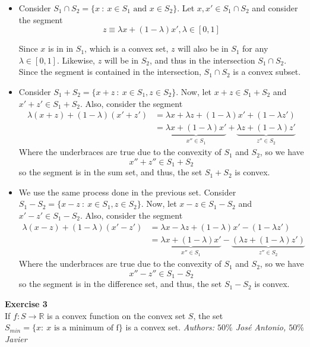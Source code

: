 \documentclass[11pt,table]{article}
\newenvironment{problem}[2][Exercise]
{ \begin{mdframed}[backgroundcolor=gray!20] \textbf{#1 #2} \\}
	{\hspace{0.0cm}\newline\newline \emph{Authors: \(50\%\) José Antonio, \(50\%\) Javier}  \end{mdframed}}
\begin{document}
	\begin{itemize}
		\item Consider \(S_{1} \cap S_{2}  =  \{x \ : \ x \in S_{1} \text{ and } x \in S_{2}\}\). Let \(x,x' \in S_1 \cap S_2\) and consider the segment
		\[
		z \equiv \lambda x + (1-\lambda)x', \lambda \in [0,1]
		\]
		
		Since \(x\) is in in \(S_1\), which is a convex set, \(z\) will also be in \(S_1\) for any \(\lambda \in [0,1]\). Likewise, \(z\) will be in \(S_2\), and thus in the intersection \(S_{1} \cap S_{2}\). Since the segment is contained in the intersection, \(S_{1} \cap S_{2}\) is a convex subset.
		
		\item Consider \(S_{1} + S_{2}  =  \{x + z \ : \ x \in S_{1}, z \in S_{2}\}\). Now, let \(x+z \in S_1 + S_2\) and \(x'+z' \in S_1+S_2\). Also, consider the segment
		\begin{align*}
			\lambda(x+z) + (1-\lambda)(x'+z') & = \lambda x + \lambda z + (1-\lambda)x' + (1-\lambda z')                                                     \\
			& = \underbrace{\lambda x +(1-\lambda)x'}_{x'' \in S_1} + \underbrace{\lambda z + (1-\lambda)z'}_{z'' \in S_2}
		\end{align*}
		Where the underbraces are true due to the convexity of \(S_1\) and \(S_2\), so we have
		\[
		x'' + z'' \in S_1 + S_2
		\]
		so the segment is in the sum set, and thus, the set \(S_1 + S_2\) is convex.
		
		\item We use the same process done in the previous set. Consider \(S_{1} - S_{2}  =  \{x - z \ : \ x \in S_{1}, z \in S_{2}\}\). Now, let \(x-z \in S_1 - S_2\) and \(x'-z' \in S_1-S_2\). Also, consider the segment
		\begin{align*}
			\lambda(x-z) + (1-\lambda)(x'-z') & = \lambda x - \lambda z + (1-\lambda)x' - (1-\lambda z')                                                                   \\
			& = \underbrace{\lambda x +(1-\lambda)x'}_{x'' \in S_1} - \underbrace{\left( \lambda z + (1-\lambda)z'\right)}_{z'' \in S_2}
		\end{align*}
		Where the underbraces are true due to the convexity of \(S_1\) and \(S_2\), so we have
		\[
		x'' - z'' \in S_1 - S_2
		\]
		so the segment is in the difference set, and thus, the set \(S_1 - S_2\) is convex.
	\end{itemize}
	
	\begin{problem}{3}
		If \( f: S \to \mathbb{R} \) is a convex function on the convex set \( S \), the set \( S_{min} = \{x : \ x \text{ is a minimum of f} \} \) is a convex set.
	\end{problem}
	
\end{document}
